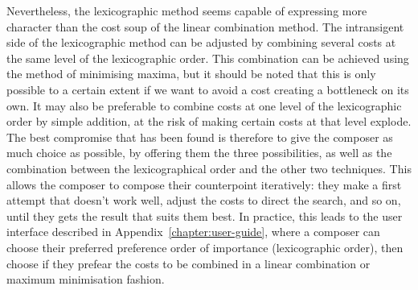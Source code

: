 Nevertheless, the lexicographic method seems capable of expressing more character than the cost soup of the linear combination method. The intransigent side of the lexicographic method can be adjusted by combining several costs at the same level of the lexicographic order. This combination can be achieved using the method of minimising maxima, but it should be noted that this is only possible to a certain extent if we want to avoid a cost creating a bottleneck on its own. It may also be preferable to combine costs at one level of the lexicographic order by simple addition, at the risk of making certain costs at that level explode.
The best compromise that has been found is therefore to give the composer as much choice as possible, by offering them the three possibilities, as well as the combination between the lexicographical order and the other two techniques. This allows the composer to compose their counterpoint iteratively: they make a first attempt that doesn't work well, adjust the costs to direct the search, and so on, until they gets the result that suits them best. In practice, this leads to the user interface described in Appendix~\ref{chapter:user-guide}, where a composer can choose their preferred preference order of importance (lexicographic order), then choose if they prefear the costs to be combined in a linear combination or maximum minimisation fashion.

